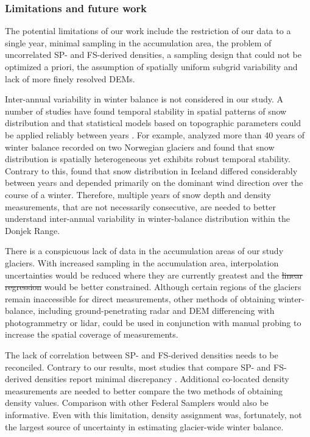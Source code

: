 \documentclass[review,oneside, letterpaper]{igs} %
\providecommand{\DIFadd}[1]{{\protect\color{blue}\uwave{#1}}} %
\providecommand{\DIFdel}[1]{{\protect\color{red}\sout{#1}}}                      %
\providecommand{\DIFaddbegin}{} %
\providecommand{\DIFaddend}{} %
\providecommand{\DIFdelbegin}{} %
\providecommand{\DIFdelend}{} %
\newcommand{\DIFscaledelfig}{0.5}
\newlength{\DIFdelgraphicswidth} %
\newlength{\DIFdelgraphicsheight} %
\newcommand{\DIFaddincludegraphics}[2][]{{\color{blue}\fbox{\DIFOincludegraphics[#1]{#2}}}} %
\newcommand{\DIFdelincludegraphics}[2][]{%
\sbox{\DIFdelgraphicsbox}{\DIFOincludegraphics[#1]{#2}}%
\settoboxwidth{\DIFdelgraphicswidth}{\DIFdelgraphicsbox} %
\settoboxtotalheight{\DIFdelgraphicsheight}{\DIFdelgraphicsbox} %
\scalebox{\DIFscaledelfig}{%
\parbox[b]{\DIFdelgraphicswidth}{\usebox{\DIFdelgraphicsbox}\\[-\baselineskip] \rule{\DIFdelgraphicswidth}{0em}}\llap{\resizebox{\DIFdelgraphicswidth}{\DIFdelgraphicsheight}{%
\setlength{\unitlength}{\DIFdelgraphicswidth}%
\begin{picture}(1,1)%
\thicklines\linethickness{2pt} %
{\color[rgb]{1,0,0}\put(0,0){\framebox(1,1){}}}%
{\color[rgb]{1,0,0}\put(0,0){\line( 1,1){1}}}%
{\color[rgb]{1,0,0}\put(0,1){\line(1,-1){1}}}%
\end{picture}%
}\hspace*{3pt}}} %
} %
\DeclareRobustCommand{\DIFaddbegin}{\DIFOaddbegin \let\includegraphics\DIFaddincludegraphics} %
\DeclareRobustCommand{\DIFaddend}{\DIFOaddend \let\includegraphics\DIFOincludegraphics} %
\DeclareRobustCommand{\DIFdelbegin}{\DIFOdelbegin \let\includegraphics\DIFdelincludegraphics} %
\DeclareRobustCommand{\DIFdelend}{\DIFOaddend \let\includegraphics\DIFOincludegraphics} %
\begin{document}
\subsubsection{Limitations and future work}


The potential limitations of our work include the restriction of our data to a single year, minimal sampling in the accumulation area, the problem of uncorrelated SP- and FS-derived densities, a sampling design that could not be optimized a priori, the assumption of spatially uniform subgrid variability and lack of more finely resolved DEMs.

Inter-annual variability in winter balance is not considered in our study. A number of studies have found temporal stability in spatial patterns of snow distribution and that statistical models based on topographic parameters could be applied reliably between years \citep[e.g.][]{Grunewald2013}. For example, \cite{Walmsley2015} analyzed more than 40 years of winter balance recorded on two Norwegian glaciers and found that snow distribution is spatially heterogeneous yet exhibits robust temporal stability. Contrary to this, \cite{Crochet2007} found that snow distribution in Iceland differed considerably between years and depended primarily on the dominant wind direction over the course of a winter. Therefore, multiple years of snow depth and density measurements, that are not necessarily consecutive, are needed to better understand inter-annual variability in winter-balance distribution within the Donjek Range.

There is a conspicuous lack of data in the accumulation areas of our study glaciers. With increased sampling in the accumulation area, interpolation uncertainties would be reduced where they are currently greatest and the \DIFdelbegin \DIFdel{linear regression }\DIFdelend \DIFaddbegin \DIFadd{LR }\DIFaddend would be better constrained. Although certain regions of the glaciers remain inaccessible for direct measurements, other methods of obtaining winter-balance, including ground-penetrating radar and DEM differencing with photogrammetry or lidar, could be used in conjunction with manual probing to increase the spatial coverage of measurements.

The lack of correlation between SP- and FS-derived densities needs to be reconciled. Contrary to our results, most studies that compare SP- and FS-derived densities report minimal discrepancy \citep[e.g.][and sources within]{Dixon2012}. Additional co-located density measurements are needed to better compare the two methods of obtaining density values. Comparison with other Federal Samplers would also be informative. Even with this limitation, density assignment was, fortunately, not the largest source of uncertainty in estimating glacier-wide winter balance. 
\end{document}
